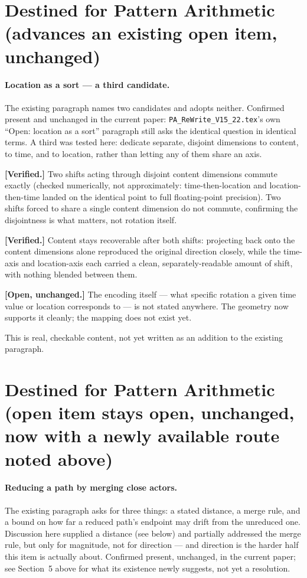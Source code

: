 \documentclass[11pt]{article}
\begin{document}
\section{Destined for Pattern Arithmetic (advances an existing open
item, unchanged)}

\paragraph{Location as a sort --- a third candidate.} The existing
paragraph names two candidates and adopts neither. Confirmed present
and unchanged in the current paper: \texttt{PA\_ReWrite\_V15\_22.tex}'s
own ``Open: location as a sort'' paragraph still asks the identical
question in identical terms. A third was tested here: dedicate
separate, disjoint dimensions to content, to time, and to location,
rather than letting any of them share an axis.

\textbf{[Verified.]} Two shifts acting through disjoint content
dimensions commute exactly (checked numerically, not approximately:
time-then-location and location-then-time landed on the identical
point to full floating-point precision). Two shifts forced to share a
single content dimension do not commute, confirming the disjointness
is what matters, not rotation itself.

\textbf{[Verified.]} Content stays recoverable after both shifts:
projecting back onto the content dimensions alone reproduced the
original direction closely, while the time-axis and location-axis
each carried a clean, separately-readable amount of shift, with
nothing blended between them.

\textbf{[Open, unchanged.]} The encoding itself --- what specific
rotation a given time value or location corresponds to --- is not
stated anywhere. The geometry now supports it cleanly; the mapping
does not exist yet.

This is real, checkable content, not yet written as an addition to
the existing paragraph.

\section{Destined for Pattern Arithmetic (open item stays open,
unchanged, now with a newly available route noted above)}
\label{sec:pathreduction}

\paragraph{Reducing a path by merging close actors.} The existing
paragraph asks for three things: a stated distance, a merge rule, and
a bound on how far a reduced path's endpoint may drift from the
unreduced one. Discussion here supplied a distance (see below) and
partially addressed the merge rule, but only for magnitude, not for
direction --- and direction is the harder half this item is actually
about. Confirmed present, unchanged, in the current paper; see
Section~5 above for what its existence newly suggests, not yet a
resolution.
\end{document}
